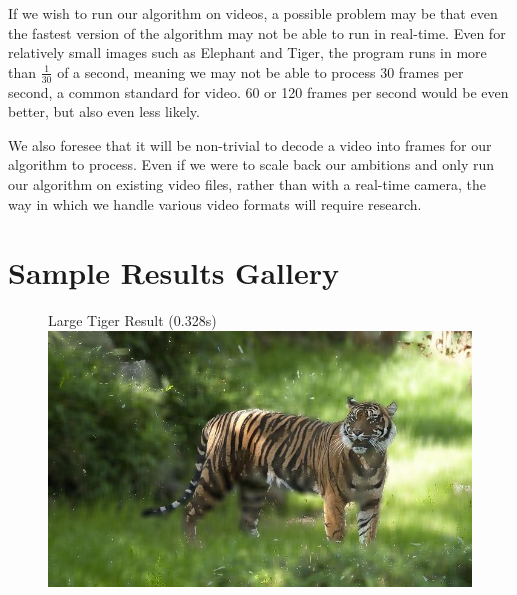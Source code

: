 \documentclass[12pt]{article}
\begin{document}
If we wish to run our algorithm on videos, a possible problem may be that even
the fastest version of the algorithm may not be able to run in real-time. Even
for relatively small images such as Elephant and Tiger, the program runs in
more than $\tfrac{1}{30}$ of a second, meaning we may not be able to process 30
frames per second, a common standard for video. 60 or 120 frames per second
would be even better, but also even less likely.

We also foresee that it will be non-trivial to decode a video into frames for
our algorithm to process. Even if we were to scale back our ambitions and only
run our algorithm on existing video files, rather than with a real-time camera,
the way in which we handle various video formats will require research.

\section{Sample Results Gallery}
\begin{figure}[!htb]
    Large Tiger Result (0.328s) \\
    \includegraphics[width=0.9\linewidth]{large_tiger_portrait.jpg}
\end{figure}
\end{document}
